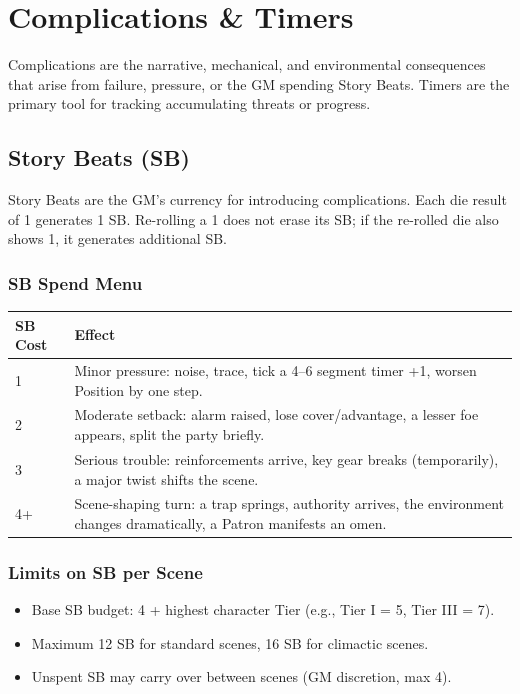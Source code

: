 
\section{Complications \& Timers}

Complications are the narrative, mechanical, and environmental consequences that arise from failure, pressure, or the GM spending Story Beats. Timers are the primary tool for tracking accumulating threats or progress.

\subsection{Story Beats (SB)}

Story Beats are the GM's currency for introducing complications. Each die result of 1 generates 1 SB. Re-rolling a 1 does not erase its SB; if the re-rolled die also shows 1, it generates additional SB.

\subsubsection{SB Spend Menu}

\begin{tabular}{@{}ll@{}}
\toprule
\textbf{SB Cost} & \textbf{Effect} \\
\midrule
1 & Minor pressure: noise, trace, tick a 4--6 segment timer +1, worsen Position by one step. \\
2 & Moderate setback: alarm raised, lose cover/advantage, a lesser foe appears, split the party briefly. \\
3 & Serious trouble: reinforcements arrive, key gear breaks (temporarily), a major twist shifts the scene. \\
4+ & Scene-shaping turn: a trap springs, authority arrives, the environment changes dramatically, a Patron manifests an omen. \\
\bottomrule
\end{tabular}

\subsubsection{Limits on SB per Scene}
\begin{itemize}
  \item Base SB budget: 4 + highest character Tier (e.g., Tier I = 5, Tier III = 7).
  \item Maximum 12 SB for standard scenes, 16 SB for climactic scenes.
  \item Unspent SB may carry over between scenes (GM discretion, max 4).
\end{itemize}

